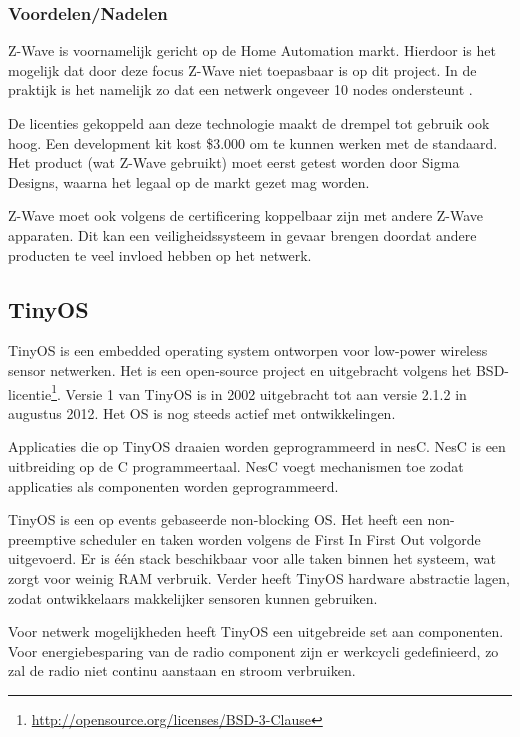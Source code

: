 \documentclass{../local}
\begin{document}
\subsubsection{Voordelen/Nadelen}
Z-Wave is voornamelijk gericht op de Home Automation markt. Hierdoor is het mogelijk dat door deze focus Z-Wave niet toepasbaar is op dit project. In de praktijk is het namelijk zo dat een netwerk ongeveer 10 nodes ondersteunt \cite{ednZWave}.

De licenties gekoppeld aan deze technologie maakt de drempel tot gebruik ook hoog. Een development kit kost \$3.000 om te kunnen werken met de standaard. Het product (wat Z-Wave gebruikt) moet eerst getest worden door Sigma Designs, waarna het legaal op de markt gezet mag worden.

Z-Wave moet ook volgens de certificering koppelbaar zijn met andere Z-Wave apparaten. Dit kan een veiligheidssysteem in gevaar brengen doordat andere producten te veel invloed hebben op het netwerk.

\subsection{TinyOS}
TinyOS is een embedded operating system ontworpen voor low-power wireless sensor netwerken. Het is een open-source project en uitgebracht volgens het BSD-licentie\footnote{\url{http://opensource.org/licenses/BSD-3-Clause}}. Versie 1 van TinyOS is in 2002 uitgebracht tot aan versie 2.1.2 in augustus 2012. Het OS is nog steeds actief met ontwikkelingen.

Applicaties die op TinyOS draaien worden geprogrammeerd in nesC\cite{nesC}. NesC is een uitbreiding op de C programmeertaal. NesC voegt mechanismen toe zodat applicaties als componenten worden geprogrammeerd.

TinyOS is een op events gebaseerde non-blocking OS. Het heeft een non-preemptive scheduler en taken worden volgens de First In First Out volgorde uitgevoerd. Er is één stack beschikbaar voor alle taken binnen het systeem, wat zorgt voor weinig RAM verbruik. Verder heeft TinyOS hardware abstractie lagen, zodat ontwikkelaars makkelijker sensoren kunnen gebruiken.

Voor netwerk mogelijkheden heeft TinyOS een uitgebreide set aan componenten. Voor energiebesparing van de radio component zijn er werkcycli gedefinieerd, zo zal de radio niet continu aanstaan en stroom verbruiken.


\end{document}
